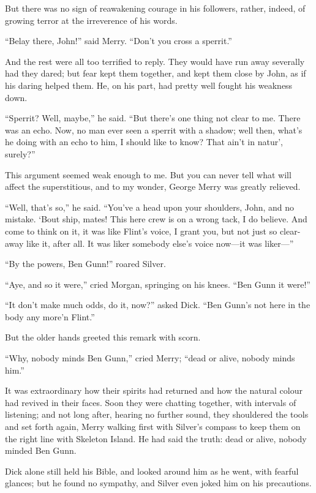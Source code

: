But there was no sign of reawakening courage in his followers, rather, indeed, of growing terror at the irreverence of his words.

\enquote{Belay there, John!} said Merry. \enquote{Don’t you cross a sperrit.}

And the rest were all too terrified to reply. They would have run away severally had they dared; but fear kept them together, and kept them close by John, as if his daring helped them. He, on his part, had pretty well fought his weakness down.

\enquote{Sperrit? Well, maybe,} he said. \enquote{But there’s one thing not clear to me. There was an echo. Now, no man ever seen a sperrit with a shadow; well then, what’s he doing with an echo to him, I should like to know? That ain’t in natur’, surely?}

This argument seemed weak enough to me. But you can never tell what will affect the superstitious, and to my wonder, George Merry was greatly relieved.

\enquote{Well, that’s so,} he said. \enquote{You’ve a head upon your shoulders, John, and no mistake. `Bout ship, mates! This here crew is on a wrong tack, I do believe. And come to think on it, it was like Flint’s voice, I grant you, but not just so clear-away like it, after all. It was liker somebody else’s voice now---it was liker---}

\enquote{By the powers, Ben Gunn!} roared Silver.

\enquote{Aye, and so it were,} cried Morgan, springing on his knees. \enquote{Ben Gunn it were!}

\enquote{It don’t make much odds, do it, now?} asked Dick. \enquote{Ben Gunn’s not here in the body any more’n Flint.}

But the older hands greeted this remark with scorn.

\enquote{Why, nobody minds Ben Gunn,} cried Merry; \enquote{dead or alive, nobody minds him.}

It was extraordinary how their spirits had returned and how the natural colour had revived in their faces. Soon they were chatting together, with intervals of listening; and not long after, hearing no further sound, they shouldered the tools and set forth again, Merry walking first with Silver’s compass to keep them on the right line with Skeleton Island. He had said the truth: dead or alive, nobody minded Ben Gunn.

Dick alone still held his Bible, and looked around him as he went, with fearful glances; but he found no sympathy, and Silver even joked him on his precautions.

